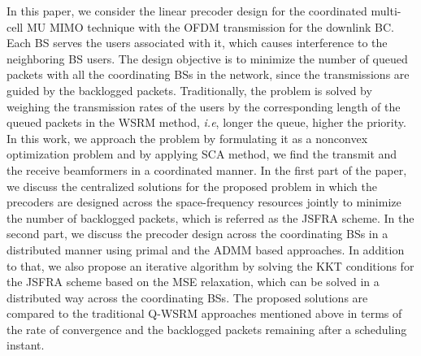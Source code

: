 In this paper, we consider the linear precoder design for the coordinated multi-cell \ac{MU} \ac{MIMO} technique with the \ac{OFDM} transmission for the downlink \acl{BC}. Each \ac{BS} serves the users associated with it, which causes interference to the neighboring \ac{BS} users. The design objective is to minimize the number of queued packets with all the coordinating \acp{BS} in the network, since the transmissions are guided by the backlogged packets. Traditionally, the problem is solved by weighing the transmission rates of the users by the corresponding length of the queued packets in the \ac{WSRM} method, \textit{i.e}, longer the queue, higher the priority. In this work, we approach the problem by formulating it as a nonconvex optimization problem and by applying \ac{SCA} method, we find the transmit and the receive beamformers in a coordinated manner. In the first part of the paper, we discuss the centralized solutions for the proposed problem in which the precoders are designed across the space-frequency resources jointly to minimize the number of backlogged packets, which is referred as the \ac{JSFRA} scheme. In the second part, we discuss the precoder design across the coordinating \acp{BS} in a distributed manner using primal and the \ac{ADMM} based approaches. In addition to that, we also propose an iterative algorithm by solving the \ac{KKT} conditions for the \ac{JSFRA} scheme based on the \ac{MSE} relaxation, which can be  solved in a distributed way across the coordinating \acp{BS}. The proposed solutions are compared to the traditional \ac{Q-WSRM} approaches mentioned above in terms of the rate of convergence and the backlogged packets remaining after a scheduling instant.
